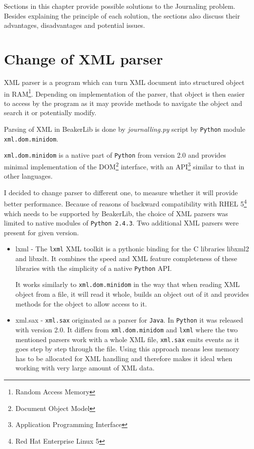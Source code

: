 Sections in this chapter provide possible solutions to the Journaling problem. Besides explaining the principle of each solution, the sections also discuss their advantages, disadvantages and potential issues.

\section{Change of XML parser}
XML parser is a program which can turn XML document into structured object in RAM\footnote{Random Access Memory}. Depending on implementation of the parser, that object is then easier to access by the program as it may provide methods to navigate the object and search it or potentially modify. 

Parsing of XML in BeakerLib is done by \textit{journalling.py} script by \texttt{Python} module \texttt{xml.dom.minidom}\cite{minidom_doc}. 

 \texttt{xml.dom.minidom} is a native part of \texttt{Python} from version 2.0 and provides minimal implementation of the DOM\footnote{Document Object Model} interface, with an API\footnote{Application Programming Interface} similar to that in other languages. 

I decided to change parser to different one, to measure whether it will provide better performance. Because of reasons of backward compatibility with RHEL 5\footnote{Red Hat Enterprise Linux 5} which needs to be supported by BeakerLib, the choice of XML parsers was limited to native modules of \texttt{Python 2.4.3}. Two additional XML parsers were present for given version.

\begin{itemize}
\item lxml - The \texttt{lxml} XML toolkit is a pythonic binding for the C libraries libxml2 and libxslt. It combines the speed and XML feature completeness of these libraries with the simplicity of a native \texttt{Python} API\cite{lxml_doc}.

It works similarly to \texttt{xml.dom.minidom} in the way that when reading XML object from a file, it will read it whole, builds an object out of it and provides methods for the object to allow access to it.
\item xml.sax  \cite{sax_doc} - \texttt{xml.sax} originated as a parser for \texttt{Java}\cite{Sax2}. In \texttt{Python} it was released with version 2.0. It differs from \texttt{xml.dom.minidom} and \texttt{lxml} where the two mentioned parsers work with a whole XML file,  \texttt{xml.sax} emits events as it goes step by step through the file\cite{sax_example}. Using this approach means less memory has to be allocated for XML handling and therefore makes it ideal when working with very large amount of XML  data.
\end{itemize}

